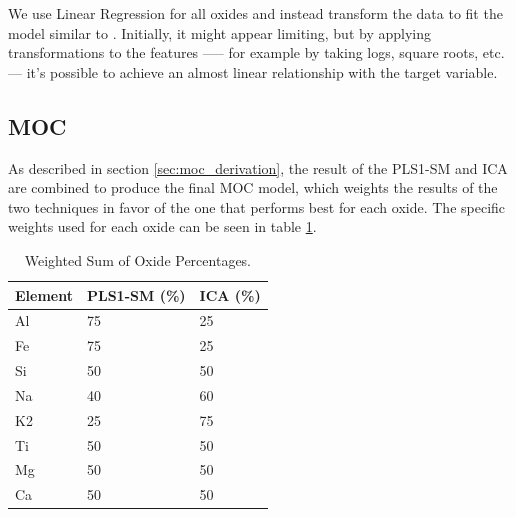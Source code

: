 We use Linear Regression for all oxides and instead transform the data to fit the model similar to \citet{kuo_detecting_2018}.
Initially, it might appear limiting, but by applying transformations to the features --— for example by taking logs, square roots, etc. --- it's possible to achieve an almost linear relationship with the target variable.

\subsection{MOC}\label{sec:methodology_moc}
As described in section \ref{sec:moc_derivation}, the result of the PLS1-SM and ICA are combined to produce the final MOC model, which weights the results of the two techniques in favor of the one that performs best for each oxide.
The specific weights used for each oxide can be seen in table \ref{tab:weighted_sum_oxide}.

\begin{table}[h]
\centering
\begin{tabular*}{\columnwidth}{@{\extracolsep{\fill}}lll}
\toprule
Element  & PLS1-SM (\%) & ICA (\%) \\ \midrule
Al       & 75           & 25      \\
Fe       & 75           & 25      \\
Si       & 50           & 50      \\
Na       & 40           & 60      \\
K2       & 25           & 75      \\
Ti       & 50           & 50      \\
Mg       & 50           & 50      \\
Ca       & 50           & 50      \\
\bottomrule
\end{tabular*}
\caption{Weighted Sum of Oxide Percentages.}
\label{tab:weighted_sum_oxide}
\end{table}